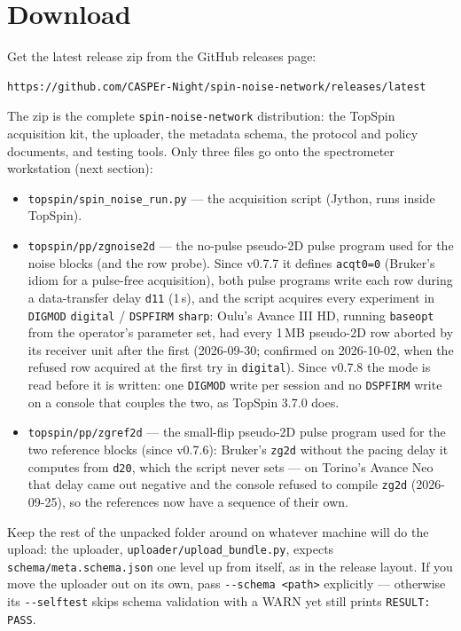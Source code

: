 \documentclass[11pt]{article}
\newcommand{\ts}{TopSpin}
\newcommand{\file}[1]{\texttt{#1}}
\begin{document}
\section{Download}

Get the latest release zip from the GitHub releases page:
\begin{lstlisting}
https://github.com/CASPEr-Night/spin-noise-network/releases/latest
\end{lstlisting}
The zip is the complete \file{spin-noise-network} distribution: the \ts{}
acquisition kit, the uploader, the metadata schema, the protocol and policy
documents, and testing tools. Only three files go onto the spectrometer
workstation (next section):
\begin{itemize}
\item \file{topspin/spin\_noise\_run.py} --- the acquisition script (Jython,
      runs inside \ts).
\item \file{topspin/pp/zgnoise2d} --- the no-pulse pseudo-2D pulse program
      used for the noise blocks (and the row probe). Since v0.7.7 it defines
      \texttt{acqt0=0} (Bruker's idiom for a pulse-free acquisition), both
      pulse programs write each row during a data-transfer delay
      \texttt{d11} (1\,s), and the script acquires every experiment in
      \texttt{DIGMOD} \texttt{digital} / \texttt{DSPFIRM} \texttt{sharp}:
      Oulu's Avance III HD, running \texttt{baseopt} from the operator's
      parameter set, had every 1\,MB pseudo-2D row aborted by its receiver
      unit after the first (2026-09-30; confirmed on 2026-10-02, when the
      refused row acquired at the first try in \texttt{digital}). Since
      v0.7.8 the mode is read before it is written: one \texttt{DIGMOD}
      write per session and no \texttt{DSPFIRM} write on a console that
      couples the two, as \ts{} 3.7.0 does.
\item \file{topspin/pp/zgref2d} --- the small-flip pseudo-2D pulse program
      used for the two reference blocks (since v0.7.6): Bruker's
      \file{zg2d} without the pacing delay it computes from \texttt{d20},
      which the script never sets --- on Torino's Avance Neo that delay
      came out negative and the console refused to compile \file{zg2d}
      (2026-09-25), so the references now have a sequence of their own.
\end{itemize}
Keep the rest of the unpacked folder around on whatever machine will do the
upload: the uploader, \file{uploader/upload\_bundle.py}, expects
\file{schema/meta.schema.json} one level up from itself, as in the release
layout. If you move the uploader out on its own, pass
\texttt{-{}-schema <path>} explicitly --- otherwise its
\texttt{-{}-selftest} skips schema validation with a WARN yet still prints
\texttt{RESULT: PASS}.
\end{document}
